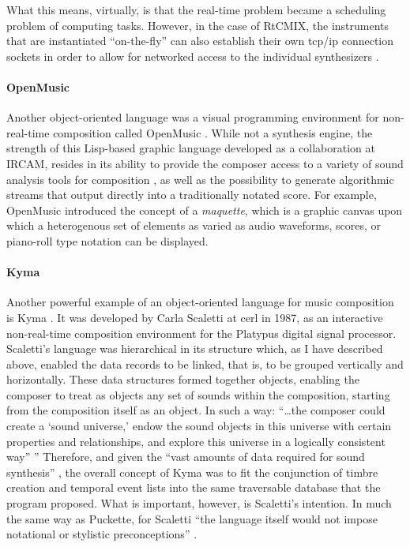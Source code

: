 	What this means, virtually, is that the real-time problem became a scheduling problem of computing tasks. However, in the case of RtCMIX, the instruments that are instantiated ``on-the-fly'' can also establish their own \gls{tcp/ip} connection sockets in order to allow for networked access to the individual synthesizers \parencite{DBLP:conf/icmc/GartonT97}.

	\paragraph{OpenMusic}
	\label{computer:openmusic}

	Another object-oriented language was a visual programming environment for non-real-time composition called OpenMusic \parencite{DBLP:conf/icmc/AssayagAFH97}. While not a synthesis engine, the strength of this Lisp-based graphic language developed as a collaboration at IRCAM, resides in its ability to provide the composer access to a variety of sound analysis tools for composition \parencite{icmc/bbp2372.2004.004, icmc/bbp2372.2010.129}, as well as the possibility to generate algorithmic streams that output directly into a traditionally notated score. For example, OpenMusic introduced the concept of a \textit{maquette}, which is a graphic canvas upon which a heterogenous set of elements as varied as audio waveforms, scores, or piano-roll type notation can be displayed.

	\paragraph{Kyma}
	\label{computer:kyma}

	Another powerful example of an object-oriented language for music composition is Kyma \parencite{DBLP:conf/icmc/Scaletti87}. It was developed by Carla Scaletti at \gls{cerl} in 1987, as an interactive non-real-time composition environment for the Platypus digital signal processor. Scaletti's language was hierarchical in its structure which, as I have described above, enabled the data records to be linked, that is, to be grouped vertically and horizontally. These data structures formed together objects, enabling the composer to treat as objects any set of sounds within the composition, starting from the composition itself as an object. In such a way: ``\dots the composer could create a `sound universe,' endow the sound objects in this universe with certain properties and relationships, and explore this universe in a logically consistent way'' \parencite[50]{DBLP:conf/icmc/Scaletti87}'' Therefore, and given the ``vast amounts of data required for sound synthesis'' \parencite[50]{DBLP:conf/icmc/Scaletti87}, the overall concept of Kyma was to fit the conjunction of timbre creation and temporal event lists into the same traversable database that the program proposed. What is important, however, is Scaletti's intention. In much the same way as Puckette, for Scaletti ``the language itself would not impose notational or stylistic preconceptions'' \parencite[50]{DBLP:conf/icmc/Scaletti87}.


